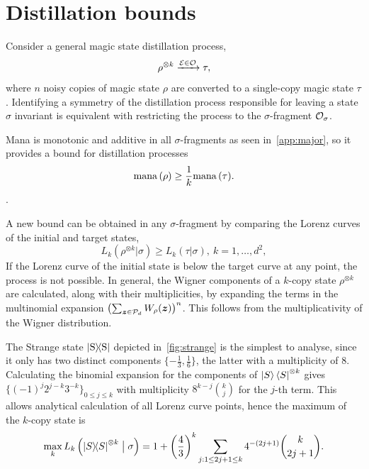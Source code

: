 \documentclass[pra,
aps,
twocolumn,
superscriptaddress,
groupedaddress,
nofootinbib,
reprint
]{revtex4-1}
\begin{document}
\section{Distillation bounds}
\label{sec:distill}

Consider a general magic state distillation process,
\begin{equation}\label{eq:distprocess}
    \rho^{\otimes k} \xrightarrow{\mathcal{E} \in \mathcal{O}} \tau,
\end{equation}
where $n$ noisy copies of magic state $\rho$ are converted to a single-copy magic state $\tau$.
Identifying a symmetry of the distillation process responsible for leaving a state $\sigma$ invariant is equivalent with restricting the process to the $\sigma$-fragment $\mathcal{O}_\sigma$.

Mana is monotonic and additive in all $\sigma$-fragments as seen in~\cref{app:major}, so it provides a bound for distillation processes
\begin{equation}
    {{\rm{mana}}\left(\rho\right)} \geq \frac{1}{k} {{\rm{mana}}\left(\tau\right)}.
\end{equation}.

A new bound can be obtained in any $\sigma$-fragment by comparing the Lorenz curves of the initial and target states,
\begin{equation}\label{eq:majbound}
    L_k(\rho^{\otimes k} | \sigma) \geq L_k (\tau | \sigma),\ k=1,\dots,d^2,
\end{equation}
If the Lorenz curve of the initial state is below the target curve at any point, the process is not possible.
In general, the Wigner components of a $k$-copy state $\rho^{\otimes k}$ are calculated, along with their multiplicities, by expanding the terms in the multinomial expansion $\left( \sum_{\bm{z} \in \mathcal{P}_d} W_\rho(\bm{z}) \right)^n$.
This follows from the multiplicativity of the Wigner distribution.

The Strange state $\ketbra{\rm{S}}$ depicted in~\cref{fig:strange} is the simplest to analyse, since it only has two distinct components $\{ -\frac{1}{3}, \frac{1}{6} \}$, the latter with a multiplicity of 8.
Calculating the binomial expansion for the components of $\ket{S}\bra{S}^{\otimes k}$ gives $\{(-1)^j 2^{j-k} 3^{-k}\}_{0 \leq j \leq k}$ with multiplicity $8^{k-j} \binom{k}{j}$ for the $j$-th term.
This allows analytical calculation of all Lorenz curve points, hence the maximum of the $k$-copy state is
\begin{equation}\label{eq:Skmax}
    \max_k{L_k \left( \ketbra{S}^{\otimes k} \bigm| \sigma \right)} = 1 + \left(\frac{4}{3}\right)^k \sum\limits_{j: 1 \leq 2j+1 \leq k} 4^{-(2j+1)} \binom{k}{2j+1}.
\end{equation}
\end{document}
